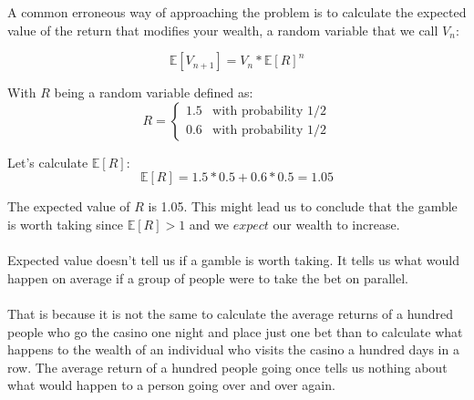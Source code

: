\documentclass[12pt]{article}
\begin{document}
A common erroneous way of approaching the problem is to calculate the expected value of the return that modifies your wealth, a random variable that we call $V_n$:

\begin{equation*}
  \mathbb{E}[V_{n+1}] = V_{n} * \mathbb{E}[R]^n
\end{equation*}

With $R$ being a random variable defined as:
\begin{equation*}
R = \left\{
	\begin{array}{ll}
		1.5 & \mbox{with probability 1/2} \\
		0.6 & \mbox{with probability 1/2}
	\end{array}
\right.
\end{equation*}

Let's calculate $\mathbb{E}[R]$:
\begin{equation*}
  \mathbb{E}[R] = 1.5 * 0.5 + 0.6 * 0.5 = 1.05
\end{equation*}

The expected value of $R$ is 1.05. This might lead us to conclude that the gamble is worth taking since $\mathbb{E}[R] > 1$ and we $expect$ our wealth to increase.
\\\\
Expected value doesn't tell us if a gamble is worth taking. It tells us what would happen on average if a group of people were to take the bet on parallel.
\\\\
That is because it is not the same to calculate the average returns of a hundred people who go the casino one night and place just one bet than to calculate what happens to the wealth of an individual who visits the casino a hundred days in a row. The average return of a hundred people going once tells us nothing about what would happen to a person going over and over again. 
\end{document}
